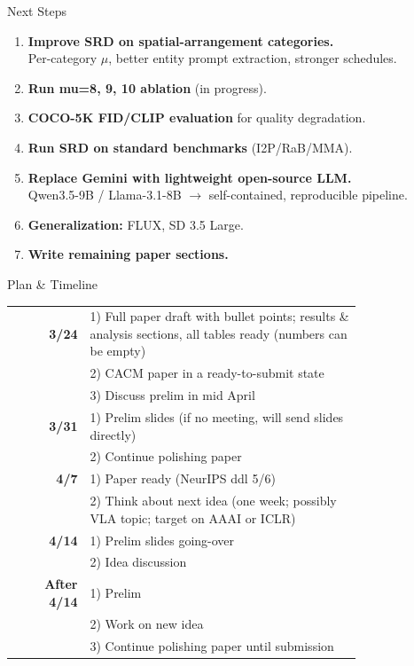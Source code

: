 \documentclass[aspectratio=169,12pt]{beamer}
\begin{document}
\begin{frame}{Next Steps}

\begin{enumerate}\itemsep3pt
\item \textbf{Improve SRD on spatial-arrangement categories.}\\
\small Per-category $\mu$, better entity prompt extraction, stronger schedules.

\item \textbf{Run mu=8, 9, 10 ablation} (in progress).

\item \textbf{COCO-5K FID/CLIP evaluation} for quality degradation.

\item \textbf{Run SRD on standard benchmarks} (I2P/RaB/MMA).

\item \textbf{Replace Gemini with lightweight open-source LLM.}\\
\small Qwen3.5-9B / Llama-3.1-8B $\to$ self-contained, reproducible pipeline.

\item \textbf{Generalization:} FLUX, SD 3.5 Large.

\item \textbf{Write remaining paper sections.}
\end{enumerate}

\end{frame}

\begin{frame}{Plan \& Timeline}

\small
\begin{tabular}{@{}r@{\hspace{12pt}}p{0.78\linewidth}@{}}
\textbf{3/24} &
  1) Full paper draft with bullet points; results \& analysis sections, all tables ready (numbers can be empty)\\
  & 2) CACM paper in a ready-to-submit state\\
  & 3) Discuss prelim in mid April\\[10pt]
\textbf{3/31} &
  1) Prelim slides (if no meeting, will send slides directly)\\
  & 2) Continue polishing paper\\[10pt]
\textbf{4/7} &
  1) Paper ready (NeurIPS ddl 5/6)\\
  & 2) Think about next idea (one week; possibly VLA topic; target on AAAI or ICLR)\\[20pt]
\textbf{4/14} &
1) Prelim slides going-over\\
& 2) Idea discussion\\[10pt]
\textbf{After 4/14} &
1) Prelim \\
& 2) Work on new idea \\
& 3) Continue polishing paper until submission
\end{tabular}



\end{frame}
\end{document}

